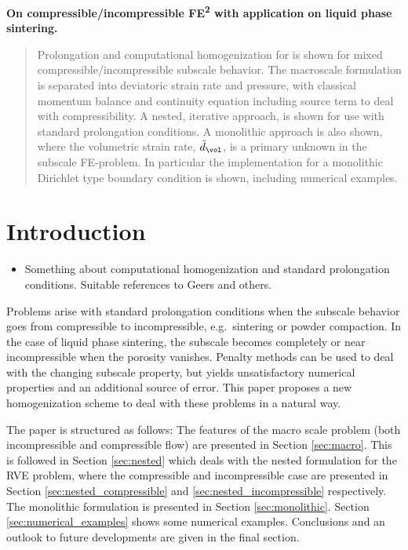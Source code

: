 \documentclass[a4paper,11pt]{article}
\begin{document}
\begin{center}
 \Large\bfseries On compressible/incompressible FE\textsuperscript{2} with application on liquid phase sintering.
\end{center}
\begin{abstract}
\noindent Prolongation and computational homogenization for is shown for mixed compressible\-/\-incompressible subscale behavior.
The macroscale formulation is separated into deviatoric strain rate and pressure,
with classical momentum balance and continuity equation including source term to deal with compressibility.
A nested, iterative approach, is shown for use with standard prolongation conditions.
A monolithic approach is also shown, where the volumetric strain rate, $\bar{d}_\vol$, is a primary unknown in the subscale FE-problem.
In particular the implementation for a monolithic Dirichlet type boundary condition is shown, including numerical examples.
\end{abstract}

\section{Introduction}
\begin{itemize}
 \item Something about computational homogenization and standard prolongation conditions. Suitable references to Geers and others.
\end{itemize}

Problems arise with standard prolongation conditions when the subscale behavior goes from compressible to incompressible, e.g.\ sintering or powder compaction.
In the case of liquid phase sintering, the subscale becomes completely or near incompressible when the porosity vanishes. 
Penalty methods can be used to deal with the changing subscale property, but yields unsatisfactory numerical properties and an additional source of error.
This paper proposes a new homogenization scheme to deal with these problems in a natural way.

The paper is structured as follows: 
The features of the macro scale problem (both incompressible and compressible flow) are presented in Section \ref{sec:macro}.
This is followed in Section \ref{sec:nested} which deals with the nested formulation for the RVE problem, 
where the compressible and incompressible case are presented in Section \ref{sec:nested_compressible} and \ref{sec:nested_incompressible} respectively.
The monolithic formulation is presented in Section \ref{sec:monolithic}. Section \ref{sec:numerical_examples} shows some numerical examples.
Conclusions and an outlook to future developments are given in the final section.
\end{document}
